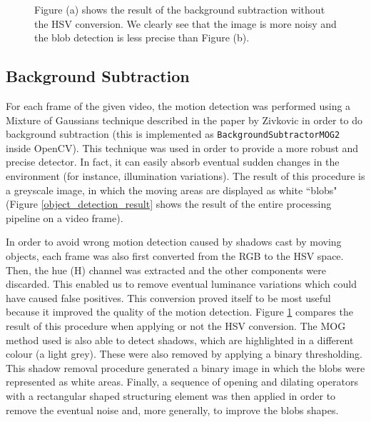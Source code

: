 \documentclass[runningheads]{llncs}
\begin{document}
\begin{figure}
\centering
{}
\hspace{0.01\linewidth}%
\caption{Figure (a) shows the result of the background subtraction without the HSV conversion. We clearly see that the image
is more noisy and the blob detection is less precise than Figure (b).}
\label{object_detection}
\end{figure}

\subsection{Background Subtraction}
For each frame of the given video, the motion detection was performed using a Mixture of Gaussians technique described in the paper by Zivkovic \cite{mog} in order to do background subtraction (this is implemented as \texttt{BackgroundSubtractorMOG2}\cite{backgroundsubtractormog} inside OpenCV). This technique was used in order to provide a more robust and precise detector. In fact, it can easily absorb eventual sudden changes in the environment (for instance, illumination variations). The result of this procedure is a greyscale image, in which the moving areas are displayed as white ``blobs" (Figure \ref{object_detection_result} shows the result of the entire processing pipeline on a video frame).
\smallskip

In order to avoid wrong motion detection caused by shadows cast by moving objects, each frame was also first converted from the RGB to the HSV space. Then, the hue (H) channel was extracted and the other components were discarded. This enabled us to remove eventual luminance variations which could have caused false positives.
This conversion proved itself to be most useful because it improved the quality of the motion detection. Figure \ref{object_detection} compares the result of this procedure when applying or not the HSV conversion.
The MOG method used is also able to detect shadows, which are highlighted in a different colour (a light grey). These were also removed by applying a binary thresholding. This shadow removal procedure generated a binary image in which the blobs were represented as white areas. 
Finally, a sequence of opening and dilating operators with a rectangular shaped structuring element was then applied in order to remove the eventual noise and, more generally, to improve the blobs shapes.
\smallskip
\end{document}
